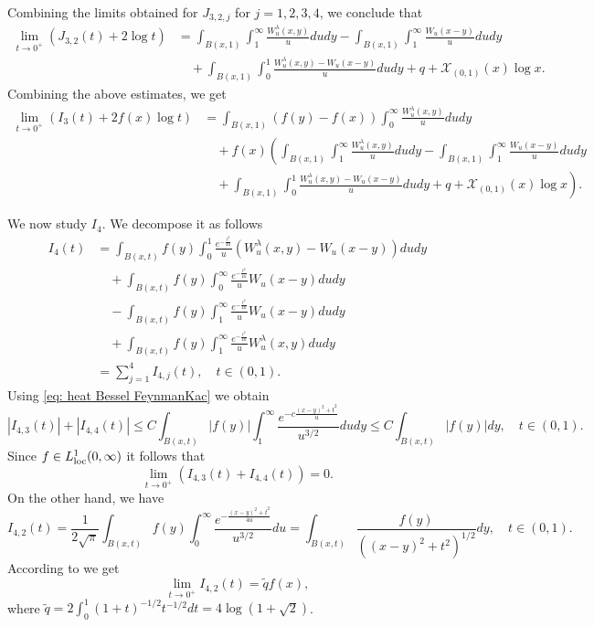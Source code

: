 \documentclass[a4paper,10pt, reqno]{amsart}
\theoremstyle{definition}
\theoremstyle{remark}
\numberwithin{equation}{section}
\begin{document}
Combining the limits obtained for $J_{3,2,j}$ for $j=1,2,3, 4$, we conclude that 
\begin{align*}
\lim_{t\rightarrow 0^+}(J_{3,2}(t)+2\log t)&=\int_{B(x,1)}\int_1^\infty \frac{W_u^\lambda (x,y)}{u}dudy-\int_{B(x,1)}\int_1^\infty \frac{W_u(x-y)}{u}dudy\\
&\quad +\int_{B(x,1)}\int_0^1\frac{W_u^\lambda (x,y)-W_u(x-y)}{u}dudy+q+\mathcal X_{(0,1)}(x)\log x.
\end{align*}
Combining the above estimates, we get
\begin{align}\label{L2}
    \lim_{t\rightarrow 0^+}(I_3(t)+2f(x)\log t)&=\int_{B(x,1)}(f(y)-f(x))\int_0^\infty \frac{W_u^\lambda (x,y)}{u}dudy\nonumber\\
    &\quad +f(x)\left(\int_{B(x,1)}\int_1^\infty \frac{W_u^\lambda (x,y)}{u}dudy-\int_{B(x,1)}\int_1^\infty \frac{W_u(x-y)}{u}dudy\right.\nonumber\\
    &\quad +\left.\int_{B(x,1)}\int_0^1\frac{W_u^\lambda (x,y)-W_u(x-y)}{u}dudy+q+\mathcal X_{(0,1)}(x)\log x\right).
\end{align}

We now study $I_4$. We decompose it as follows
\begin{align*}
I_4(t)&=\int_{B(x,t)}f(y)\int_0^1\frac{e^{-\frac{t^2}{4u}}}{u}(W_u^\lambda (x,y)-W_u(x-y))dudy\\
&\quad +\int_{B(x,t)}f(y)\int_0^\infty \frac{e^{-\frac{t^2}{4u}}}{u}W_u (x-y)dudy\\
&\quad -\int_{B(x,t)}f(y)\int_1^\infty \frac{e^{-\frac{t^2}{4u}}}{u}W_u (x-y)dudy\\
&\quad +\int_{B(x,t)}f(y)\int_1^\infty \frac{e^{-\frac{t^2}{4u}}}{u}W_u^\lambda (x,y)dudy\\
&=\sum_{j=1}^4I_{4,j}(t),\quad t\in (0,1).
\end{align*}
Using \eqref{eq: heat Bessel FeynmanKac} we obtain
\[
|I_{4,3}(t)|+|I_{4,4}(t)|\leq C\int_{B(x,t)}|f(y)|\int_1^\infty \frac{e^{-c\frac{(x-y)^2+t^2}{u}}}{u^{3/2}}dudy\leq C\int_{B(x,t)}|f(y)|dy,\quad t\in (0,1).
\]
Since $f\in L^1_{\rm loc}(0,\infty)$ it follows that
\[
\lim_{t\rightarrow 0^+}(I_{4,3}(t)+I_{4,4}(t))=0.
\]
On the other hand, we have
\[
I_{4,2}(t)=\frac{1}{2\sqrt{\pi}}\int_{B(x,t)}f(y)\int_0^\infty \frac{e^{-\frac{(x-y)^2+t^2}{4u}}}{u^{3/2}}du=\int_{B(x,t)}\frac{f(y)}{((x-y)^2+t^2)^{1/2}}dy,\quad t\in (0,1).
\]
According to \cite[(4.50)]{ChHW} we get
\[
\lim_{t\rightarrow 0^+}I_{4,2}(t)=\widetilde{q}f(x),
\]
where $\widetilde{q}=2\int_0^1(1+t)^{-1/2}t^{-1/2}dt=4\log(1 + \sqrt{2})$.
\end{document}
